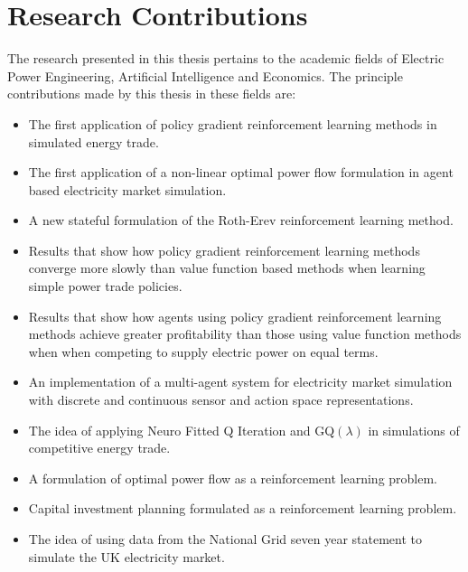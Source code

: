 \section{Research Contributions}
The research presented in this thesis pertains to the academic fields of
Electric Power Engineering, Artificial Intelligence and Economics.  The
principle contributions made by this thesis in these fields are:

\begin{itemize}
  \item The first application of policy gradient reinforcement learning methods
  in simulated energy trade.
  \item The first application of a non-linear optimal power flow formulation in
  agent based electricity market simulation.
  \item A new stateful formulation of the Roth-Erev reinforcement learning
  method.
  \item Results that show how policy gradient reinforcement learning
  methods converge more slowly than value function based methods when learning
  simple power trade policies.
  \item Results that show how agents using policy gradient
  reinforcement learning methods achieve greater profitability than those
  using value function methods when when competing to supply electric power on
  equal terms.
  \item An implementation of a multi-agent system for electricity market
  simulation with discrete and continuous sensor and action space
  representations.
  \item The idea of applying Neuro Fitted Q Iteration and GQ$(\lambda)$ in
  simulations of competitive energy trade.
  \item A formulation of optimal power flow as a reinforcement learning
  problem.
  \item Capital investment planning formulated as a reinforcement learning
  problem.
  \item The idea of using data from the National Grid seven year statement to
  simulate the UK electricity market.
\end{itemize}

